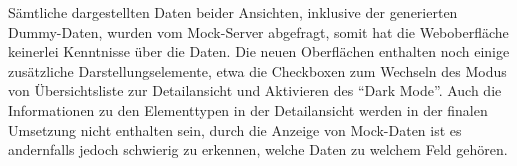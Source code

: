 Sämtliche dargestellten Daten beider Ansichten, inklusive der generierten Dummy-Daten, wurden vom Mock-Server abgefragt, somit hat die Weboberfläche keinerlei Kenntnisse über die Daten. Die neuen Oberflächen enthalten noch einige zusätzliche Darstellungselemente, etwa die Checkboxen zum Wechseln des Modus von Übersichtsliste zur Detailansicht und Aktivieren des \enquote{Dark Mode}. Auch die Informationen zu den Elementtypen in der Detailansicht werden in der finalen Umsetzung nicht enthalten sein, durch die Anzeige von Mock-Daten ist es andernfalls jedoch schwierig zu erkennen, welche Daten zu welchem Feld gehören.
